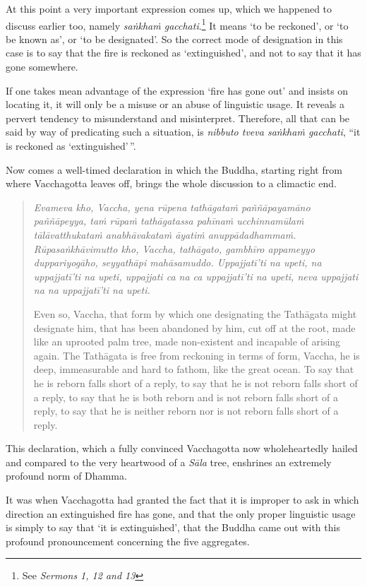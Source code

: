 At this point a very important expression comes up, which we happened to discuss earlier too, namely \emph{saṅkhaṁ gacchati}.\footnote{See \emph{Sermons 1, 12 and 13}} It means `to be reckoned', or `to be known as', or `to be designated'. So the correct mode of designation in this case is to say that the fire is reckoned as `extinguished', and not to say that it has gone somewhere.

If one takes mean advantage of the expression `fire has gone out' and insists on locating it, it will only be a misuse or an abuse of linguistic usage. It reveals a pervert tendency to misunderstand and misinterpret. Therefore, all that can be said by way of predicating such a situation, is \emph{nibbuto tveva saṅkhaṁ gacchati}, ``it is reckoned as `extinguished'\,''.

Now comes a well-timed declaration in which the Buddha, starting right from where Vacchagotta leaves off, brings the whole discussion to a climactic end.

\begin{quote}
\emph{Evameva kho, Vaccha, yena rūpena tathāgataṁ paññāpayamāno paññāpeyya, taṁ rūpaṁ tathāgatassa pahīnaṁ ucchinnamūlaṁ tālāvatthukataṁ anabhāvakataṁ āyatiṁ anuppādadhammaṁ. Rūpasaṅkhāvimutto kho, Vaccha, tathāgato, gambhīro appameyyo duppariyogāho, seyyathāpi mahāsamuddo. Uppajjatī'ti na upeti, na uppajjatī'ti na upeti, uppajjati ca na ca uppajjatī'ti na upeti, neva uppajjati na na uppajjatī'ti na upeti.}

Even so, Vaccha, that form by which one designating the Tathāgata might designate him, that has been abandoned by him, cut off at the root, made like an uprooted palm tree, made non-existent and incapable of arising again. The Tathāgata is free from reckoning in terms of form, Vaccha, he is deep, immeasurable and hard to fathom, like the great ocean. To say that he is reborn falls short of a reply, to say that he is not reborn falls short of a reply, to say that he is both reborn and is not reborn falls short of a reply, to say that he is neither reborn nor is not reborn falls short of a reply.
\end{quote}

This declaration, which a fully convinced Vacchagotta now wholeheartedly hailed and compared to the very heartwood of a \emph{Sāla} tree, enshrines an extremely profound norm of Dhamma.

It was when Vacchagotta had granted the fact that it is improper to ask in which direction an extinguished fire has gone, and that the only proper linguistic usage is simply to say that `it is extinguished', that the Buddha came out with this profound pronouncement concerning the five aggregates.

